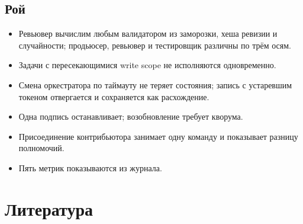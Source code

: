 \section*{Рой}
\begin{itemize}
\item Ревьювер вычислим любым валидатором из заморозки, хеша ревизии и случайности; продьюсер, ревьювер и тестировщик различны по трём осям.
\item Задачи с пересекающимися write scope не исполняются одновременно.
\item Смена оркестратора по таймауту не теряет состояния; запись с устаревшим токеном отвергается и сохраняется как расхождение.
\item Одна подпись останавливает; возобновление требует кворума.
\item Присоединение контрибьютора занимает одну команду и показывает разницу полномочий.
\item Пять метрик показываются из журнала.
\end{itemize}

\chapter{Литература}

